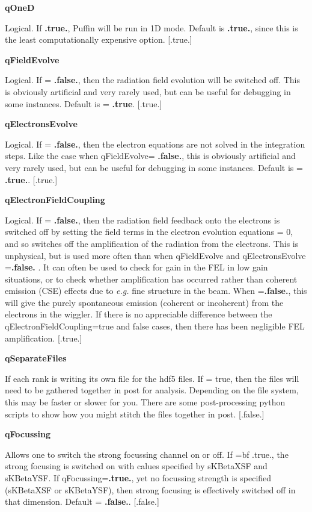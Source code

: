 \documentclass[12pt]{article}%
\begin{document}
{\bf qOneD}

Logical. If  {\bf .true.}, Puffin will be run in 1D mode. Default is  {\bf .true.}, since this is the least computationally expensive option. [.true.]

{\bf qFieldEvolve}

Logical. If = {\bf .false.}, then the radiation field evolution will be switched off. This is obviously artificial and very rarely used, but can be useful for debugging in some instances. Default is = {\bf .true}. [.true.]

{\bf qElectronsEvolve}

Logical. If = {\bf .false.}, then the electron equations are not solved in the integration steps. Like the case when qFieldEvolve= {\bf .false.},  this is obviously artificial and very rarely used, but can be useful for debugging in some instances. Default is = {\bf .true.}. [.true.]

{\bf qElectronFieldCoupling}

Logical. If = {\bf .false.}, then the radiation field feedback onto the electrons is switched off by setting the field terms in the electron evolution equations = 0, and so switches off the amplification of the radiation from the electrons. This is unphysical, but is used more often than when qFieldEvolve and qElectronsEvolve ={\bf .false.} . It can often be used to check for gain in the FEL in low gain situations, or to check whether amplification has occurred rather than coherent emission (CSE) effects due to \textit{e.g.} fine structure in the beam. When ={\bf .false.}, this will give the purely spontaneous emission (coherent or incoherent) from the electrons in the wiggler. If there is no appreciable difference between the qElectronFieldCoupling=true and false cases, then there has been negligible FEL amplification. [.true.]

{\bf qSeparateFiles}

If each rank is writing its own file for the hdf5 files. If = true, then the files will need to be gathered together in post for analysis. Depending on the file system, this may be faster or slower for you. There are some post-processing python scripts to show how you might stitch the files together in post. [.false.]

{\bf qFocussing}

Allows one to switch the strong focussing channel on or off. If ={bf .true.}, the strong focusing is switched on with calues specified by sKBetaXSF and sKBetaYSF. If qFocussing={\bf .true.}, yet no focussing strength is specified (sKBetaXSF or sKBetaYSF), then strong focusing is effectively switched off in that dimension. Default = {\bf .false.}. [.false.]
\end{document}
